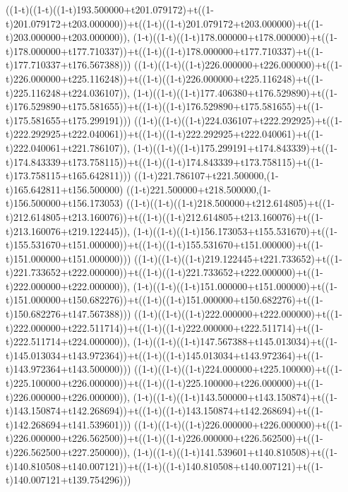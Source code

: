 ((1-t)((1-t)((1-t)193.500000+t201.079172)+t((1-t)201.079172+t203.000000))+t((1-t)((1-t)201.079172+t203.000000)+t((1-t)203.000000+t203.000000)),                                     (1-t)((1-t)((1-t)178.000000+t178.000000)+t((1-t)178.000000+t177.710337))+t((1-t)((1-t)178.000000+t177.710337)+t((1-t)177.710337+t176.567388)))
((1-t)((1-t)((1-t)226.000000+t226.000000)+t((1-t)226.000000+t225.116248))+t((1-t)((1-t)226.000000+t225.116248)+t((1-t)225.116248+t224.036107)),                                     (1-t)((1-t)((1-t)177.406380+t176.529890)+t((1-t)176.529890+t175.581655))+t((1-t)((1-t)176.529890+t175.581655)+t((1-t)175.581655+t175.299191)))
((1-t)((1-t)((1-t)224.036107+t222.292925)+t((1-t)222.292925+t222.040061))+t((1-t)((1-t)222.292925+t222.040061)+t((1-t)222.040061+t221.786107)),                                     (1-t)((1-t)((1-t)175.299191+t174.843339)+t((1-t)174.843339+t173.758115))+t((1-t)((1-t)174.843339+t173.758115)+t((1-t)173.758115+t165.642811)))
((1-t)221.786107+t221.500000,(1-t)165.642811+t156.500000)
((1-t)221.500000+t218.500000,(1-t)156.500000+t156.173053)
((1-t)((1-t)((1-t)218.500000+t212.614805)+t((1-t)212.614805+t213.160076))+t((1-t)((1-t)212.614805+t213.160076)+t((1-t)213.160076+t219.122445)),                                     (1-t)((1-t)((1-t)156.173053+t155.531670)+t((1-t)155.531670+t151.000000))+t((1-t)((1-t)155.531670+t151.000000)+t((1-t)151.000000+t151.000000)))
((1-t)((1-t)((1-t)219.122445+t221.733652)+t((1-t)221.733652+t222.000000))+t((1-t)((1-t)221.733652+t222.000000)+t((1-t)222.000000+t222.000000)),                                     (1-t)((1-t)((1-t)151.000000+t151.000000)+t((1-t)151.000000+t150.682276))+t((1-t)((1-t)151.000000+t150.682276)+t((1-t)150.682276+t147.567388)))
((1-t)((1-t)((1-t)222.000000+t222.000000)+t((1-t)222.000000+t222.511714))+t((1-t)((1-t)222.000000+t222.511714)+t((1-t)222.511714+t224.000000)),                                     (1-t)((1-t)((1-t)147.567388+t145.013034)+t((1-t)145.013034+t143.972364))+t((1-t)((1-t)145.013034+t143.972364)+t((1-t)143.972364+t143.500000)))
((1-t)((1-t)((1-t)224.000000+t225.100000)+t((1-t)225.100000+t226.000000))+t((1-t)((1-t)225.100000+t226.000000)+t((1-t)226.000000+t226.000000)),                                     (1-t)((1-t)((1-t)143.500000+t143.150874)+t((1-t)143.150874+t142.268694))+t((1-t)((1-t)143.150874+t142.268694)+t((1-t)142.268694+t141.539601)))
((1-t)((1-t)((1-t)226.000000+t226.000000)+t((1-t)226.000000+t226.562500))+t((1-t)((1-t)226.000000+t226.562500)+t((1-t)226.562500+t227.250000)),                                     (1-t)((1-t)((1-t)141.539601+t140.810508)+t((1-t)140.810508+t140.007121))+t((1-t)((1-t)140.810508+t140.007121)+t((1-t)140.007121+t139.754296)))

